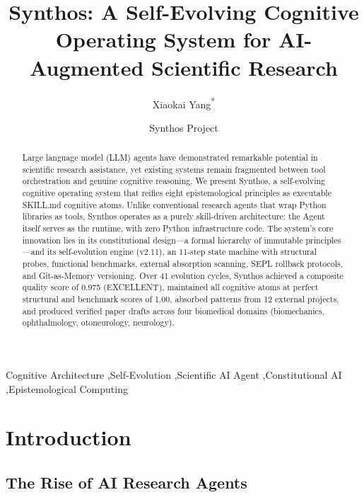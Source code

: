 \documentclass[review]{elsarticle}
\begin{document}
\begin{frontmatter}

\title{Synthos: A Self-Evolving Cognitive Operating System for AI-Augmented Scientific Research}

\author[1]{Xiaokai Yang\textsuperscript{*}}
\author[2]{Synthos Project}
\address[1]{Department of Neurology, Wenzhou People's Hospital, Wenzhou 325000, China}
\address[2]{GitHub: \url{https://github.com/yakeworld/Synthos}}

\begin{abstract}
Large language model (LLM) agents have demonstrated remarkable potential in scientific research assistance, yet existing systems remain fragmented between tool orchestration and genuine cognitive reasoning. We present Synthos, a self-evolving cognitive operating system that reifies eight epistemological principles as executable SKILL.md cognitive atoms. Unlike conventional research agents that wrap Python libraries as tools, Synthos operates as a purely skill-driven architecture: the Agent itself serves as the runtime, with zero Python infrastructure code. The system's core innovation lies in its constitutional design---a formal hierarchy of immutable principles---and its self-evolution engine (v2.11), an 11-step state machine with structural probes, functional benchmarks, external absorption scanning, SEPL rollback protocols, and Git-as-Memory versioning. Over 41 evolution cycles, Synthos achieved a composite quality score of 0.975 (EXCELLENT), maintained all cognitive atoms at perfect structural and benchmark scores of 1.00, absorbed patterns from 12 external projects, and produced verified paper drafts across four biomedical domains (biomechanics, ophthalmology, otoneurology, neurology).
\end{abstract}

\begin{keyword}
Cognitive Architecture \sep Self-Evolution \sep Scientific AI Agent \sep Constitutional AI \sep Epistemological Computing
\end{keyword}
\end{frontmatter}

\section{Introduction}
\label{sec:introduction}

\subsection{The Rise of AI Research Agents}
\label{sec:rise}
\end{document}

